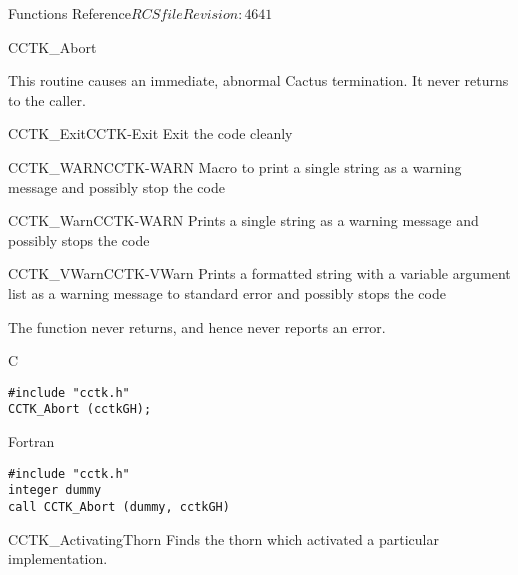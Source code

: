 \begin{cactuspart}{ Functions Reference}{$RCSfile$}{$Revision: 4641 $}
\begin{FunctionDescription}{CCTK\_Abort}
\begin{Discussion}
This routine causes an immediate, abnormal Cactus termination.
It never returns to the caller.
\end{Discussion}

\begin{SeeAlsoSection}
\begin{SeeAlso2}{CCTK\_Exit}{CCTK-Exit}
Exit the code cleanly
\end{SeeAlso2}
\begin{SeeAlso2}{CCTK\_WARN}{CCTK-WARN}
Macro to print a single string as a warning message and possibly stop the code
\end{SeeAlso2}
\begin{SeeAlso2}{CCTK\_Warn}{CCTK-WARN}
Prints a single string as a warning message and possibly stops the code
\end{SeeAlso2}
\begin{SeeAlso2}{CCTK\_VWarn}{CCTK-VWarn}
Prints a formatted string with a variable argument list as a warning
message to standard error and possibly stops the code
\end{SeeAlso2}
\end{SeeAlsoSection}

\begin{ErrorSection}
\begin{Error}{}
The function never returns, and hence never reports an error.
\end{Error}
\end{ErrorSection}

\begin{ExampleSection}
\begin{Example}{C}
\begin{verbatim}
#include "cctk.h"
CCTK_Abort (cctkGH);
\end{verbatim}
\end{Example}
\begin{Example}{Fortran}
\begin{verbatim}
#include "cctk.h"
integer dummy
call CCTK_Abort (dummy, cctkGH)
\end{verbatim}
\end{Example}
\end{ExampleSection}
\end{FunctionDescription}



\begin{FunctionDescription}{CCTK\_ActivatingThorn}
\label{CCTK-ActivatingThorn}
Finds the thorn which activated a particular implementation.


\end{FunctionDescription}
\end{cactuspart}
